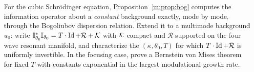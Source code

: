 \begin{openquestion}\label{m:op:planewave}
For the cubic Schr\"odinger equation, Proposition~\ref{m:prop:bog} computes the information operator about a \emph{constant} background exactly, mode by mode, through the Bogoliubov dispersion relation. Extend it to a multimode background $u_0$: write $\mathbb{I}^*_{\theta_0}\mathbb{I}_{\theta_0}=T\cdot\operatorname{Id}+\mathcal R+\mathcal{K}$ with $\mathcal{K}$ compact and $\mathcal R$ supported on the four wave resonant manifold, and characterize the $(\kappa,\theta_0,T)$ for which $T\cdot\operatorname{Id}+\mathcal R$ is uniformly invertible. In the focusing case, prove a Bernstein von Mises theorem for fixed $T$ with constants exponential in the largest modulational growth rate.
\end{openquestion}
